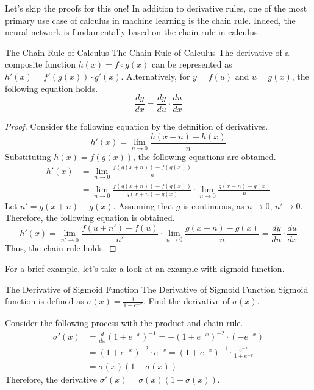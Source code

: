\documentclass[../main.tex]{subfiles}
\begin{document}
Let's skip the proofs for this one! In addition to derivative rules,
one of the most primary use case of calculus in machine learning is
the chain rule. Indeed, the neural network is fundamentally based on
the chain rule in calculus.

\begin{theorem}
{The Chain Rule of Calculus}
{The Chain Rule of Calculus}
The derivative of a composite function $h(x) = f \circ g (x)$ can be
represented as $h'(x) = f'(g(x)) \cdot g'(x)$. Alternatively,
for $y = f(u)$ and $u = g(x)$, the following equation holds.
\[
\frac{dy}{dx} = \frac{dy}{du} \cdot \frac{du}{dx}
\]
\end{theorem}
\begin{proof}
Consider the following equation by the definition of derivatives.
\[
h'(x)
= \lim_{n \to 0} \frac{h(x + n) - h(x)}{n}
\]
Substituting $h(x) = f(g(x))$, the following equations are obtained.
\begin{align*}
h'(x)
&= \lim_{n \to 0} \frac{f(g(x + n)) - f(g(x))}{n} \\
&= \lim_{n \to 0} \frac{f(g(x + n)) - f(g(x))}{g(x + n) - g(x)} \cdot
    \lim_{n \to 0} \frac{g(x + n) - g(x)}{n}
\end{align*}
Let $n' = g(x + n) - g(x)$. Assuming that $g$ is continuous,
as $n \to 0$, $n' \to 0$. Therefore, the following equation is
obtained.
\[
h'(x)
= \lim_{n' \to 0} \frac{f(u + n') - f(u)}{n'} \cdot
    \lim_{n \to 0} \frac{g(x + n) - g(x)}{n}
= \frac{dy}{du} \cdot \frac{du}{dx}
\]
Thus, the chain rule holds.
\end{proof}

For a brief example, let's take a look at an example with sigmoid
function.

\begin{problem}
{The Derivative of Sigmoid Function}
{The Derivative of Sigmoid Function}
Sigmoid function is defined as $\sigma(x) = \frac{1}{1 + e^{-x}}$.
Find the derivative of $\sigma(x)$.
\end{problem}
\begin{solution}
Consider the following process with the product and chain rule.
\begin{align*}
    \sigma'(x)
    &= \frac{d}{dx} \left( 1 + e^{-x} \right)^{-1}
    = - \left( 1 + e^{-x} \right)^{-2} \cdot \left( -e^{-x} \right) \\
    &= \left( 1 + e^{-x} \right)^{-2} \cdot e^{-x}
    = \left( 1 + e^{-x} \right)^{-1} \cdot
        \frac{e^{-x}}{1 + e^{-x}} \\
    &= \sigma(x) \left( 1 - \sigma(x) \right)
\end{align*}
Therefore, the derivative $\sigma'(x) = \sigma(x) (1 - \sigma(x))$.
\end{solution}
\end{document}
